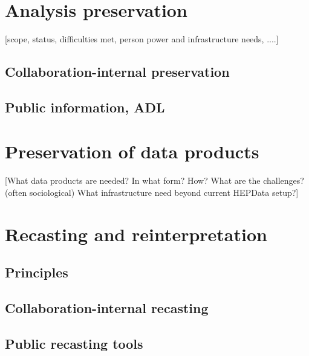\documentclass[11pt]{article}
\begin{document}
\section{Analysis preservation}

[scope, status, difficulties met, person power and infrastructure needs, ....]

\subsection{Collaboration-internal preservation}

\subsection{Public information, ADL}

\section{Preservation of data products}

[What data products are needed? In what form? How? 
What are the challenges? (often sociological) What infrastructure need beyond current HEPData setup?]


\section{Recasting and reinterpretation}

\subsection{Principles}

\subsection{Collaboration-internal recasting}

\subsection{Public recasting tools}
\end{document}
